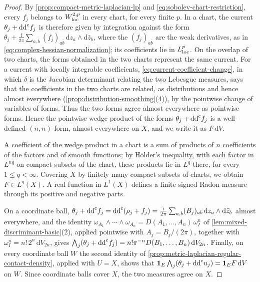 \begin{proof}
By \cref{prop:compact-metric-laplacian-lp} and \eqref{eq:sobolev-chart-restriction}, every $f_j$ belongs to $W^{2,p}_{\mathrm{loc}}$ in every chart, for every finite $p$. In a chart, the current $\theta_j+\mathrm{dd}^{\mathrm{c}} f_j$ is therefore given by integration against the form $\theta_j+\frac{\mathrm i}{2\pi}\sum_{a,b}(f_j)_{a\bar b}\,\mathrm dz_a\wedge\mathrm d\bar z_b$, where the $(f_j)_{a\bar b}$ are the weak derivatives, as in \eqref{eq:complex-hessian-normalization}; its coefficients lie in $L^p_{\mathrm{loc}}$. On the overlap of two charts, the forms obtained in the two charts represent the same current. For a current with locally integrable coefficients, \eqref{eq:current-coefficient-change}, in which $\delta$ is the Jacobian determinant relating the two Lebesgue measures, says that the coefficients in the two charts are related, as distributions and hence almost everywhere (\cref{prop:distribution-smoothing}(4)), by the pointwise change of variables of forms. Thus the two forms agree almost everywhere as pointwise forms. Hence the pointwise wedge product of the forms $\theta_j+\mathrm{dd}^{\mathrm{c}} f_j$ is a well-defined $(n,n)$-form, almost everywhere on $X$, and we write it as $F\,\mathrm dV$.

A coefficient of the wedge product in a chart is a sum of products of $n$ coefficients of the factors and of smooth functions; by H\"older's inequality, with each factor in $L^{nq}$ on compact subsets of the chart, these products lie in $L^q$ there, for every $1\leq q<\infty$. Covering $X$ by finitely many compact subsets of charts, we obtain $F\in L^q(X)$. A real function in $L^1(X)$ defines a finite signed Radon measure through its positive and negative parts.

On a coordinate ball, $\theta_j+\mathrm{dd}^{\mathrm{c}} f_j=\mathrm{dd}^{\mathrm{c}}(\rho_j+f_j)=\frac{\mathrm i}{2\pi}\sum_{a,b}(B_j)_{ab}\,\mathrm dz_a\wedge\mathrm d\bar z_b$ almost everywhere, and the identity $\omega_{A_1}\wedge\cdots\wedge\omega_{A_n}=D(A_1,\ldots,A_n)\,\omega_I^n$ of \cref{lem:mixed-discriminant-basic}(2), applied pointwise with $A_j=B_j/(2\pi)$, together with $\omega_I^n=n!\,2^n\,\mathrm dV_{2n}$, gives $\bigwedge_j(\theta_j+\mathrm{dd}^{\mathrm{c}} f_j)=n!\pi^{-n}D(B_1,\ldots,B_n)\,\mathrm dV_{2n}$. Finally, on every coordinate ball $W$ the second identity of \cref{prop:metric-laplacian-regular-contact-density}, applied with $U=X$, shows that $\mathbf1_E\bigwedge_j(\theta_j+\mathrm{dd}^{\mathrm{c}} u_j)=\mathbf1_EF\,\mathrm dV$ on $W$. Since coordinate balls cover $X$, the two measures agree on $X$.
\end{proof}

